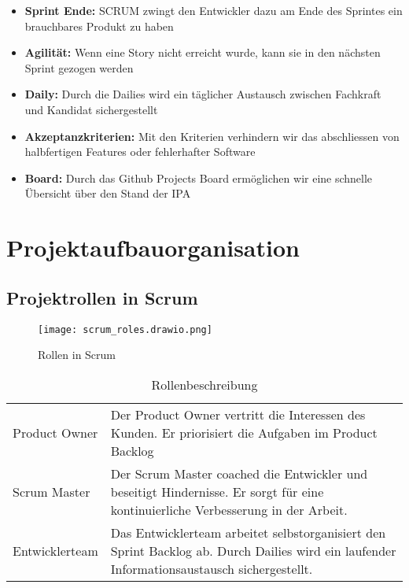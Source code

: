 \begin{itemize}
    \item \textbf{Sprint Ende:} SCRUM zwingt den Entwickler dazu am Ende des Sprintes ein brauchbares Produkt zu haben
    \item \textbf{Agilität:} Wenn eine Story nicht erreicht wurde, kann sie in den nächsten Sprint gezogen werden
    \item \textbf{Daily:} Durch die Dailies wird ein täglicher Austausch zwischen Fachkraft und Kandidat sichergestellt
    \item \textbf{Akzeptanzkriterien:} Mit den Kriterien verhindern wir das abschliessen von halbfertigen Features oder fehlerhafter Software
    \item \textbf{Board:} Durch das Github Projects Board ermöglichen wir eine schnelle Übersicht über den Stand der IPA

\end{itemize}

\chapter{Projektaufbauorganisation}
\section{Projektrollen in Scrum}
\begin{figure}[h]
    \centering
    \texttt{[image: scrum\_roles.drawio.png]}
    \caption{Rollen in Scrum}
\end{figure}


\begin{table}[h!]
        \begin{tabular}{|L{0.4\textwidth}|L{0.5\textwidth}|}
            \hline
              \\[12pt]
            \hline
            Product Owner & Der Product Owner vertritt die Interessen des Kunden. Er priorisiert die Aufgaben im Product Backlog  \\
            \hline
            Scrum Master & Der Scrum Master coached die Entwickler und beseitigt Hindernisse. Er sorgt für eine 
            kontinuierliche Verbesserung in der Arbeit. \\
            \hline
            Entwicklerteam & Das Entwicklerteam arbeitet selbstorganisiert den Sprint Backlog ab. 
            Durch Dailies wird ein laufender Informationsaustausch sichergestellt. \\
            \hline
          \end{tabular}
          \caption{Rollenbeschreibung}
\end{table}

